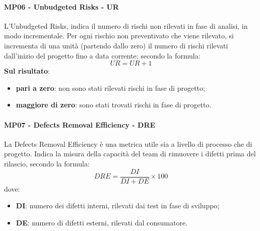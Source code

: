 	 \paragraph{MP06 - Unbudgeted Risks - UR}
	 L'Unbudgeted Risks, indica il numero di rischi non rilevati in fase di analisi, in modo incrementale. Per ogni rischio non preventivato che viene rilevato, si incrementa di una unità (partendo dallo zero) il numero di rischi rilevati dall'inizio del progetto fino a data corrente; secondo la formula:
	 \begin{displaymath}
	 	UR = UR + 1 
	 \end{displaymath}
 	{\bfseries Sul risultato}:
 	\begin{itemize}
 		\item {\bfseries pari a zero}: non sono stati rilevati rischi in fase di progetto;
 		\item {\bfseries maggiore di zero}: sono stati trovati rischi in fase di progetto.\\
 	\end{itemize}
	 \paragraph{MP07 - Defects Removal Efficiency - DRE}
	 La Defects Removal Efficiency è una metrica utile sia a livello di processo che di progetto. Indica la misura della capacità del team di rimuovere i difetti prima del rilascio, secondo la formula:
	 \begin{displaymath}
	 DRE = \frac{DI}{DI+DE}\times100
	 \end{displaymath}
 	dove:
 	\begin{itemize}
 		\item {\bfseries DI}: numero dei difetti interni, rilevati dai test in fase di sviluppo;
 		\item {\bfseries DE}: numero di difetti esterni, rilevati dal consumatore.\\
 		
 	\end{itemize}
 
	 
		 
